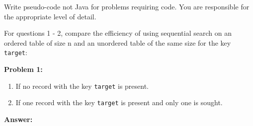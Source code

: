 \documentclass[10pt,letterpaper,final]{report}
\begin{document}
\begin{center}
  \vline
\end{center}

\medskip

Write pseudo-code not Java for problems requiring code. You are responsible for the appropriate level of detail.

For questions 1 - 2, compare the efficiency of using sequential search on an ordered table of size n and an unordered table of the same size for the key \texttt{target}:
\medskip

\noindent\textbf{Problem 1:}
\medskip

\begin{enumerate}
  \item If no record with the key \texttt{target} is present.
  \item If one record with the key \texttt{target} is present and only one is sought.
\end{enumerate}


\medskip
\noindent\textbf{Answer:}
\medskip
\end{document}
